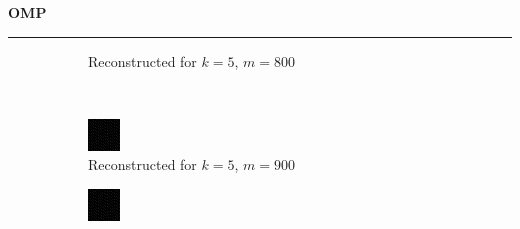 \documentclass[a4paper,12pt]{article}
\newenvironment{solution}[2][]{%
    \begin{mdframed}[linecolor=blue!70!black, linewidth=2pt, roundcorner=10pt, backgroundcolor=yellow!10!white, skipabove=12pt, skipbelow=12pt]%
        \textbf{\large #2}
        \par\noindent\rule{\textwidth}{0.4pt}
}{
    \end{mdframed}
}
\begin{document}
\begin{solution}{OMP}
\begin{figure}[H]
\begin{subfigure}[t]{0.23\textwidth}
        \caption{Reconstructed for $k = 5$, $m = 800$}
    \end{subfigure}\\
    \begin{subfigure}[t]{0.23\textwidth}
        \centering
        \includegraphics[width=\textwidth]{../images/omp/Reconstructed_k_5_m_900.png}
        \caption{Reconstructed for $k = 5$, $m = 900$}
    \end{subfigure}
    \begin{subfigure}[t]{0.23\textwidth}
        \centering
        \includegraphics[width=\textwidth]{../images/omp/Reconstructed_k_5_m_1000.png}

\end{subfigure}
\end{figure}
\end{solution}
\end{document}

